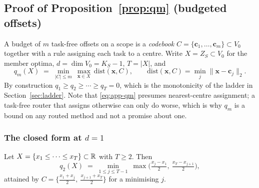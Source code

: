 \subsection{Proof of Proposition~\ref{prop:qm} (budgeted offsets)}
\label{app:proof-qm}

A budget of $m$ task-free offsets on a scope is a \emph{codebook}
$C=\{\bm{c}_1,\dots,\bm{c}_m\}\subset V_0$ together with a rule assigning each task
to a centre. Write $X=Z_S\subset V_0$ for the member optima, $d=\dim V_0=K_S-1$,
$T=|X|$, and
\begin{equation}
  q_m(X)\;=\;\min_{|C|\le m}\ \max_{\bm{x}\in X}\ \mathrm{dist}(\bm{x},C),
  \qquad \mathrm{dist}(\bm{x},C)=\min_{j}\|\bm{x}-\bm{c}_j\|_2 .
  \label{eq:app-qm}
\end{equation}
By construction $q_1\ge q_2\ge\cdots\ge q_T=0$, which is the monotonicity of the
ladder in Section~\ref{sec:ladder}. Note that \eqref{eq:app-qm} presumes
nearest-centre assignment; a task-free router that assigns otherwise can only do
worse, which is why $q_m$ is a bound on any routed method and not a promise about
one.

\subsubsection{The closed form at \texorpdfstring{$d=1$}{d=1}}

\begin{proposition}[Closed form, $m=2$, $d=1$]
\label{prop:q2-closed}
Let $X=\{x_1\le\cdots\le x_T\}\subset\mathbb{R}$ with $T\ge2$. Then
\begin{equation}
  q_2(X)\;=\;\min_{1\le j\le T-1}\ \max\!\Big(\tfrac{x_j-x_1}{2},\ \tfrac{x_T-x_{j+1}}{2}\Big),
  \label{eq:app-q2}
\end{equation}
attained by $C=\{\tfrac{x_1+x_j}{2},\ \tfrac{x_{j+1}+x_T}{2}\}$ for a minimising $j$.
\end{proposition}

